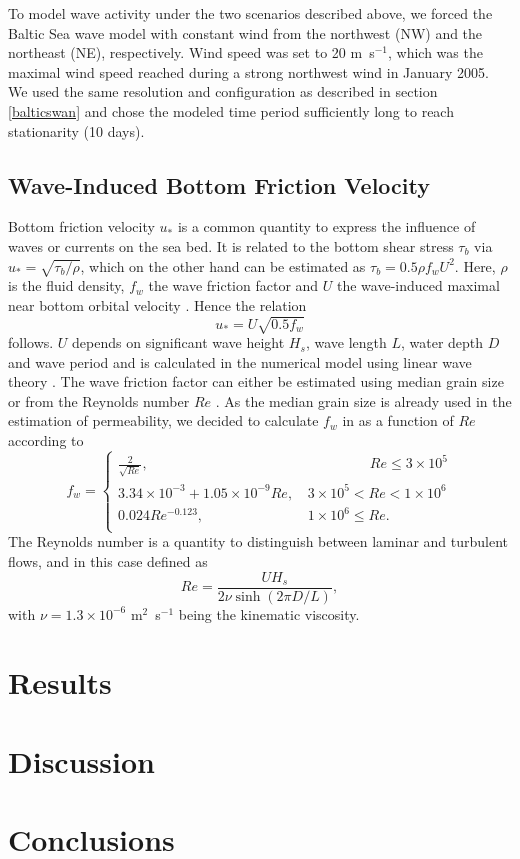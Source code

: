 To model wave activity under the two scenarios described above, we forced the 
Baltic Sea wave model with constant wind from the northwest (NW) and the 
northeast (NE), respectively. Wind speed was set to 20 m~s$^{-1}$, which was 
the maximal wind speed reached during a strong northwest wind in January 2005.
We used the same resolution and configuration as described in 
section \ref{balticswan} and chose the modeled time period sufficiently long to 
reach stationarity (10 days).

\subsection{Wave-Induced Bottom Friction Velocity}

Bottom friction velocity $u_\ast$ is a common quantity to express the influence 
of waves or currents on the sea bed. It is related to the bottom shear stress 
$\tau_b$ via $u_\ast = \sqrt{\tau_b \slash \rho}$, which on the other hand can 
be estimated as $\tau_b = 0.5 \rho f_w U^2$. Here, $\rho$ is the fluid 
density, $f_w$ the wave friction factor and $U$ the wave-induced
maximal near bottom orbital velocity \citep[][]{schwartz2006}. Hence the 
relation
\begin{equation}
 \label{ustar}
 u_\ast = U \sqrt{0.5 f_w}
\end{equation}
follows. $U$ depends on significant wave height $H_s$, wave length 
$L$, water depth $D$ and wave period and is calculated in the numerical 
model using linear wave theory \citep[][]{holthuijsen2007, schwartz2006}. The 
wave friction factor can either be estimated using median grain size 
\citep[][]{swart1974, nielsen1992} or from the Reynolds number $Re$ 
\citep[][]{nielsen1992, jonsson2004}. As the median grain size is already used 
in the estimation of permeability, we decided to calculate $f_w$ in as a 
function of $Re$ according to
\begin{equation}
 \label{fw}
 f_w = \left\{ \begin{array}{lll}
             \frac{2}{\sqrt{Re}}, & \qquad \qquad \; \,  Re \leq 3 \times 10^5 
\\
              3.34 \times 10^{-3} + 1.05 \times 10^{-9} Re, \, &3 \times 10^5 < 
							  Re < 1 \times 10^6 \\
	      0.024 Re^{-0.123}, \, &1 \times 10^6 \leq Re. \\
              \end{array} 
              \right. 
\end{equation}
The Reynolds number is a quantity to distinguish between laminar and turbulent 
flows, and in this case defined as
\begin{equation}
 \label{reynolds}
 Re = \frac{U H_s}{2 \nu \sinh (2 \pi D \slash L) },
\end{equation}
with $\nu = 1.3 \times 10^{-6}$ m$^2$~s$^{-1}$ being the kinematic viscosity.
\section{Results}	



\section{Discussion}

\section{Conclusions}